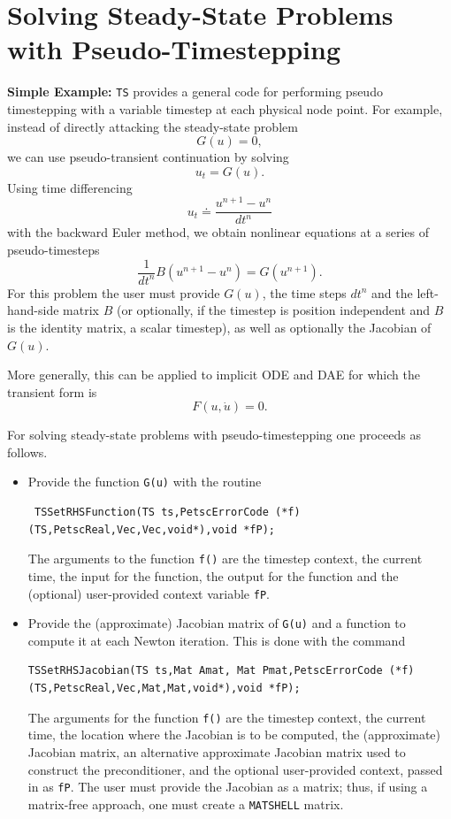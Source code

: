 {\vspace{.2cm}

\cleardoublepage
\chapter{Solving Steady-State Problems with Pseudo-Timestepping}

\vspace{.2cm}

\noindent
{\bf Simple Example:}
\lstinline{TS} provides a general code for performing pseudo timestepping
with a variable timestep at each physical node point. For example, instead of
directly attacking the steady-state problem
\[
           G(u) = 0,
\]
we can use pseudo-transient continuation by solving
\[
           u_t = G(u).
\]
Using time differencing
\[
   u_t \doteq \frac{{u^{n+1}} - {u^{n}} }{dt^{n}}
\]
with the backward Euler method, we obtain
nonlinear equations at a series of pseudo-timesteps
\[
           \frac{1}{dt^n} B (u^{n+1} - u^{n} ) = G(u^{n+1}).
\]
For this problem the user must provide $G(u)$,
the time steps $dt^{n}$ and the left-hand-side matrix $B$
(or optionally, if the timestep is position independent and $B$ is the
identity matrix,
a scalar timestep), as well as optionally the Jacobian of $G(u)$.

More generally, this can be applied to implicit ODE and DAE for which
the transient form is
\[
  F(u,\dot{u}) = 0.
\]

For solving steady-state problems with pseudo-timestepping one proceeds
as follows.
\begin{itemize}
\item Provide the function \lstinline{G(u)} with the routine
\begin{lstlisting}
 TSSetRHSFunction(TS ts,PetscErrorCode (*f)(TS,PetscReal,Vec,Vec,void*),void *fP);
\end{lstlisting}
The  arguments to the function \lstinline{f()} are
the timestep context, the current time, the input for the function,
the output for the function and the (optional) user-provided context
variable \lstinline{fP}.

\item Provide the (approximate) Jacobian matrix of \lstinline{G(u)} and a
function to compute it at each Newton iteration. This is done with the command
\begin{lstlisting}
TSSetRHSJacobian(TS ts,Mat Amat, Mat Pmat,PetscErrorCode (*f)(TS,PetscReal,Vec,Mat,Mat,void*),void *fP);
\end{lstlisting}
The  arguments for the function \lstinline{f()} are
the timestep context, the current time, the location where the
Jacobian is to be computed, the (approximate) Jacobian matrix, an alternative
approximate Jacobian matrix used to construct the preconditioner, and the optional
user-provided context, passed in as \lstinline{fP}. The user must provide the
Jacobian as a matrix; thus, if using a matrix-free approach, one
must create a \lstinline{MATSHELL} matrix.
\end{itemize}

}

